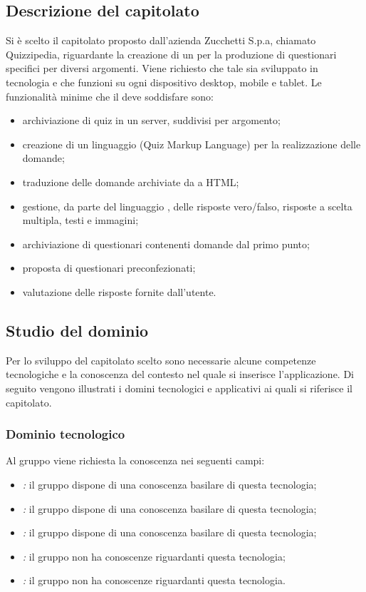 \documentclass[a4paper, titlepage]{article}
\begin{document}
\subsection{Descrizione del capitolato}
Si è scelto il capitolato proposto dall'azienda Zucchetti S.p.a, chiamato Quizzipedia, riguardante la creazione di un  per la produzione di questionari specifici per diversi argomenti. Viene richiesto che tale  sia sviluppato in tecnologia  e che funzioni su ogni dispositivo desktop, mobile e tablet.
Le funzionalità minime che il  deve soddisfare sono:
\begin{itemize}
	\item archiviazione di quiz in un server, suddivisi per argomento;
	\item creazione di un linguaggio  (Quiz Markup Language) per la realizzazione delle domande;
	\item traduzione delle domande archiviate da  a HTML;
	\item gestione, da parte del linguaggio , delle risposte vero/falso, risposte a scelta multipla, testi e immagini;
	\item archiviazione di questionari contenenti domande dal primo punto;
	\item proposta di questionari preconfezionati;
	\item valutazione delle risposte fornite dall'utente.
\end{itemize}

\subsection{Studio del dominio}
Per lo sviluppo del capitolato scelto sono necessarie alcune competenze tecnologiche e la conoscenza del contesto nel quale si inserisce l’applicazione. Di seguito vengono illustrati i domini tecnologici e applicativi ai quali si riferisce il capitolato.
\subsubsection{Dominio tecnologico}
Al gruppo viene richiesta la conoscenza nei seguenti campi:
\begin{itemize}
	\item \textit{:} il gruppo dispone di una conoscenza basilare di questa tecnologia;
	\item \textit{:} il gruppo dispone di una conoscenza basilare di questa tecnologia;
	\item \textit{:} il gruppo dispone di una conoscenza basilare di questa tecnologia;
	\item \textit{:} il gruppo non ha conoscenze riguardanti questa tecnologia;
	\item \textit{:} il gruppo non ha conoscenze riguardanti questa tecnologia.
\end{itemize}
\end{document}
